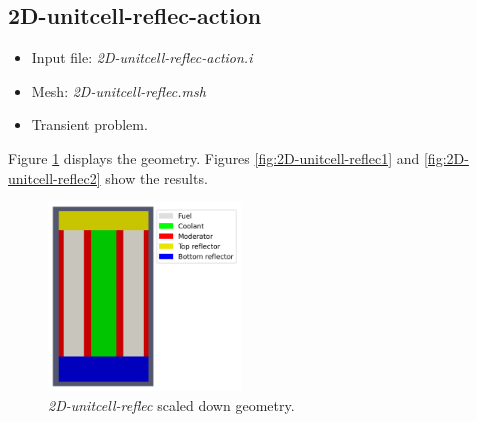 \documentclass[11pt,letterpaper]{article}
\begin{document}
\subsection{2D-unitcell-reflec-action}

	\begin{itemize}
		\item Input file: \textit{2D-unitcell-reflec-action.i}
		\item Mesh: \textit{2D-unitcell-reflec.msh}
		\item Transient problem.
	\end{itemize}

Figure \ref{fig:2D-unitcell-reflec} displays the geometry.
Figures \ref{fig:2D-unitcell-reflec1} and \ref{fig:2D-unitcell-reflec2} show the results.

	\begin{figure}[htbp!]
		\centering
		\includegraphics[height=5cm]{2D-unitcell-reflec-mesh}
		\caption{\textit{2D-unitcell-reflec} scaled down geometry.}
		\label{fig:2D-unitcell-reflec}
	\end{figure}
\end{document}
